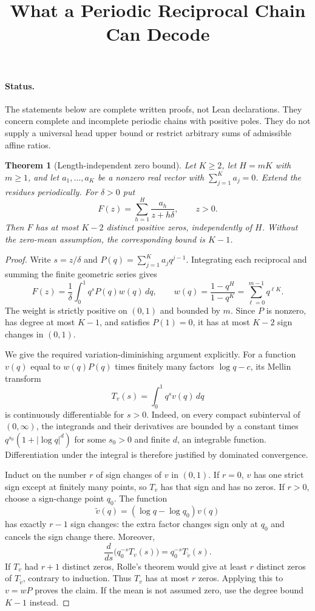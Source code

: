 \documentclass[11pt]{article}
\title{What a Periodic Reciprocal Chain Can Decode}
\author{}
\date{}
\newtheorem{theorem}{Theorem}
\begin{document}
\maketitle

\paragraph{Status.}
The statements below are complete written proofs, not Lean declarations.
They concern complete and incomplete periodic chains with positive poles. They do not
supply a universal head upper bound or restrict arbitrary sums of
admissible affine ratios.

\begin{theorem}[Length-independent zero bound]
Let $K\ge2$, let $H=mK$ with $m\ge1$, and let
$a_1,\ldots,a_K$ be a nonzero real vector with
$\sum_{j=1}^K a_j=0$. Extend the residues periodically. For $\delta>0$
put
\[
 F(z)=\sum_{h=1}^{H}\frac{a_h}{z+h\delta},\qquad z>0.
\]
Then $F$ has at most $K-2$ distinct positive zeros, independently of $H$.
Without the zero-mean assumption, the corresponding bound is $K-1$.
\end{theorem}

\begin{proof}
Write $s=z/\delta$ and
$P(q)=\sum_{j=1}^K a_j q^{j-1}$. Integrating each reciprocal and
summing the finite geometric series gives
\[
 F(z)=\frac1\delta\int_0^1 q^s P(q) w(q)\,dq,
 \qquad
 w(q)=\frac{1-q^H}{1-q^K}=\sum_{\ell=0}^{m-1}q^{\ell K}.
\]
The weight is strictly positive on $(0,1)$ and bounded by $m$.
Since $P$ is nonzero, has degree at most $K-1$, and satisfies $P(1)=0$,
it has at most $K-2$ sign changes in $(0,1)$.

We give the required variation-diminishing argument explicitly.
For a function $v(q)$ equal to $w(q)P(q)$ times finitely many factors
$\log q-c$, its Mellin transform
\[
 T_v(s)=\int_0^1q^s v(q)\,dq
\]
is continuously differentiable for $s>0$. Indeed, on every compact
subinterval of $(0,\infty)$, the integrands and their derivatives are
bounded by a constant times $q^{s_0}(1+|\log q|^d)$ for some
$s_0>0$ and finite $d$, an integrable function. Differentiation under
the integral is therefore justified by dominated convergence.

Induct on the number $r$ of sign changes of $v$ in $(0,1)$.
If $r=0$, $v$ has one strict sign except at finitely many points,
so $T_v$ has that sign and has no zeros. If $r>0$, choose a
sign-change point $q_0$. The function
\[
 \widetilde v(q)=(\log q-\log q_0)v(q)
\]
has exactly $r-1$ sign changes: the extra factor changes sign only
at $q_0$ and cancels the sign change there. Moreover,
\[
 \frac{d}{ds}\bigl(q_0^{-s}T_v(s)\bigr)
 =q_0^{-s}T_{\widetilde v}(s).
\]
If $T_v$ had $r+1$ distinct zeros, Rolle's theorem would give at
least $r$ distinct zeros of $T_{\widetilde v}$, contrary to induction.
Thus $T_v$ has at most $r$ zeros. Applying this to $v=wP$ proves
the claim. If the mean is not assumed zero, use the degree bound
$K-1$ instead.
\end{proof}
\end{document}
